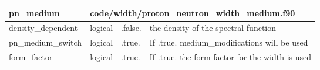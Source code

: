 \documentclass{article}
\begin{document}
\begin{longtable}{llll}
\toprule
\textbf{\large{pn\_medium}} & \multicolumn{3}{l}{\footnotesize{code/width/proton\_neutron\_width\_medium.f90}}\\*
\midrule
\endfirsthead
\midrule
\endhead
density\_dependent & \begin{minipage}[t]{2cm}logical\end{minipage} & \begin{minipage}[t]{2cm}.false.\end{minipage} & \begin{minipage}[t]{12cm}the density of the spectral function\end{minipage}\\*
\midrule
pn\_medium\_switch & \begin{minipage}[t]{2cm}logical\end{minipage} & \begin{minipage}[t]{2cm}.true.\end{minipage} & \begin{minipage}[t]{12cm}If .true. medium\_modifications will be used\end{minipage}\\*
\midrule
form\_factor & \begin{minipage}[t]{2cm}logical\end{minipage} & \begin{minipage}[t]{2cm}.true.\end{minipage} & \begin{minipage}[t]{12cm}If .true. the form factor for the width is used\end{minipage}\\*
\bottomrule
\end{longtable}
{ }



\end{document}
